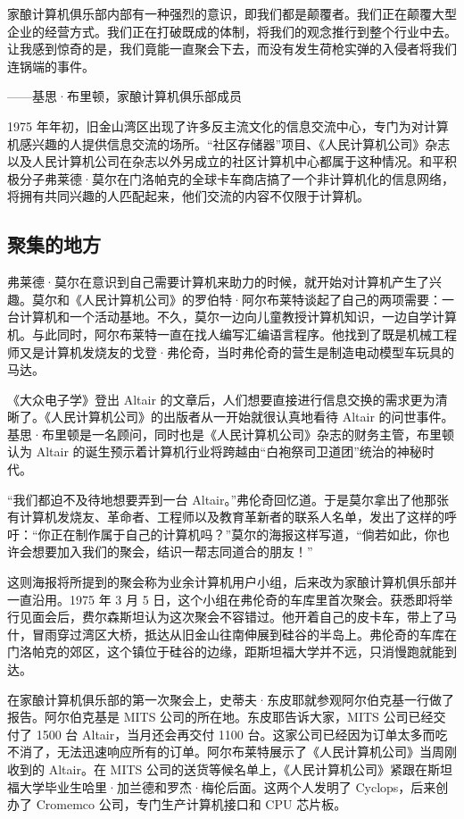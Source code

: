 \documentclass[12pt,UTF8]{ctexbook}
\begin{document}
家酿计算机俱乐部内部有一种强烈的意识，即我们都是颠覆者。我们正在颠覆大型企业的经营方式。我们正在打破既成的体制，将我们的观念推行到整个行业中去。让我感到惊奇的是，我们竟能一直聚会下去，而没有发生荷枪实弹的入侵者将我们连锅端的事件。

——基思·布里顿，家酿计算机俱乐部成员



1975 年年初，旧金山湾区出现了许多反主流文化的信息交流中心，专门为对计算机感兴趣的人提供信息交流的场所。“社区存储器”项目、《人民计算机公司》杂志以及人民计算机公司在杂志以外另成立的社区计算机中心都属于这种情况。和平积极分子弗莱德·莫尔在门洛帕克的全球卡车商店搞了一个非计算机化的信息网络，将拥有共同兴趣的人匹配起来，他们交流的内容不仅限于计算机。





\subsection{聚集的地方}


弗莱德·莫尔在意识到自己需要计算机来助力的时候，就开始对计算机产生了兴趣。莫尔和《人民计算机公司》的罗伯特·阿尔布莱特谈起了自己的两项需要：一台计算机和一个活动基地。不久，莫尔一边向儿童教授计算机知识，一边自学计算机。与此同时，阿尔布莱特一直在找人编写汇编语言程序。他找到了既是机械工程师又是计算机发烧友的戈登·弗伦奇，当时弗伦奇的营生是制造电动模型车玩具的马达。

《大众电子学》登出 Altair 的文章后，人们想要直接进行信息交换的需求更为清晰了。《人民计算机公司》的出版者从一开始就很认真地看待 Altair 的问世事件。基思·布里顿是一名顾问，同时也是《人民计算机公司》杂志的财务主管，布里顿认为 Altair 的诞生预示着计算机行业将跨越由“白袍祭司卫道团”统治的神秘时代。

“我们都迫不及待地想要弄到一台 Altair。”弗伦奇回忆道。于是莫尔拿出了他那张有计算机发烧友、革命者、工程师以及教育革新者的联系人名单，发出了这样的呼吁：“你正在制作属于自己的计算机吗？”莫尔的海报这样写道，“倘若如此，你也许会想要加入我们的聚会，结识一帮志同道合的朋友！”

这则海报将所提到的聚会称为业余计算机用户小组，后来改为家酿计算机俱乐部并一直沿用。1975 年 3 月 5 日，这个小组在弗伦奇的车库里首次聚会。获悉即将举行见面会后，费尔森斯坦认为这次聚会不容错过。他开着自己的皮卡车，带上了马什，冒雨穿过湾区大桥，抵达从旧金山往南伸展到硅谷的半岛上。弗伦奇的车库在门洛帕克的郊区，这个镇位于硅谷的边缘，距斯坦福大学并不远，只消慢跑就能到达。

在家酿计算机俱乐部的第一次聚会上，史蒂夫·东皮耶就参观阿尔伯克基一行做了报告。阿尔伯克基是 MITS 公司的所在地。东皮耶告诉大家，MITS 公司已经交付了 1500 台 Altair，当月还会再交付 1100 台。这家公司已经因为订单太多而吃不消了，无法迅速响应所有的订单。阿尔布莱特展示了《人民计算机公司》当周刚收到的 Altair。在 MITS 公司的送货等候名单上，《人民计算机公司》紧跟在斯坦福大学毕业生哈里·加兰德和罗杰·梅伦后面。这两个人发明了 Cyclops，后来创办了 Cromemco 公司，专门生产计算机接口和 CPU 芯片板。
\end{document}

